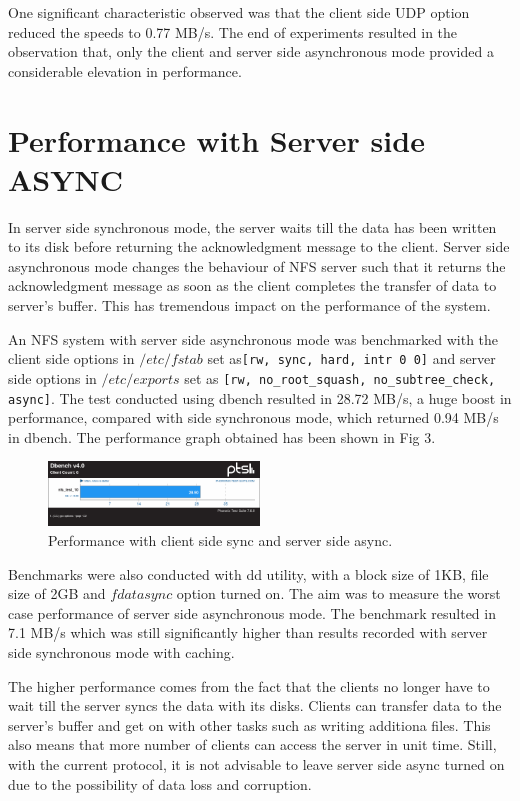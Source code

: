\documentclass[conference]{IEEEtran}
\begin{document}
One significant characteristic observed was that the client side UDP option 
reduced the speeds to 0.77 MB/s. The end of experiments resulted in the 
observation that, only the client and server side asynchronous mode provided
a considerable elevation in performance. 

\section{Performance with Server side ASYNC}
In server side synchronous mode, the server waits till the data has been 
written to its disk before returning the acknowledgment message to the 
client. Server side asynchronous mode changes the behaviour of NFS server 
such that it returns the acknowledgment message as soon as the client 
completes the transfer of data to server's buffer. This has tremendous
impact on the performance of the system.

An NFS system with server side asynchronous mode was benchmarked with the
client side options in $/etc/fstab$ set as\texttt{[rw, sync, hard, intr 0 0]}  and
server side options in $/etc/exports$ set as
\texttt{[rw, no\_root\_squash, no\_subtree\_check, async]}. The test conducted using
dbench resulted in 28.72 MB/s, a huge boost in performance, compared with
side synchronous mode, which returned 0.94 MB/s in dbench. The performance
graph obtained has been shown in Fig 3.
\begin{figure}[htbp]
\centerline{\includegraphics[width=0.5\textwidth,natwidth=400,natheight=300]{server_async_fig.png}}
\caption{Performance with client side sync and server side async.}
\label{fig}
\end{figure}
Benchmarks were also conducted with dd utility, with a block size of 1KB,
file size of 2GB and $fdatasync$ option turned on. The aim was to measure the
worst case performance of server side asynchronous mode. The benchmark
resulted in 7.1 MB/s which was still significantly higher than results
recorded with server side synchronous mode with caching.

The higher performance comes from the fact that the clients no longer have
to wait till the server syncs the data with its disks. Clients can transfer
data to the server's buffer and get on with other tasks such as writing
additiona files. This also means that more number of clients can access the
server in unit time. Still, with the current protocol, it is not advisable
to leave server side async turned on due to the possibility of data loss and
corruption.
\end{document}
